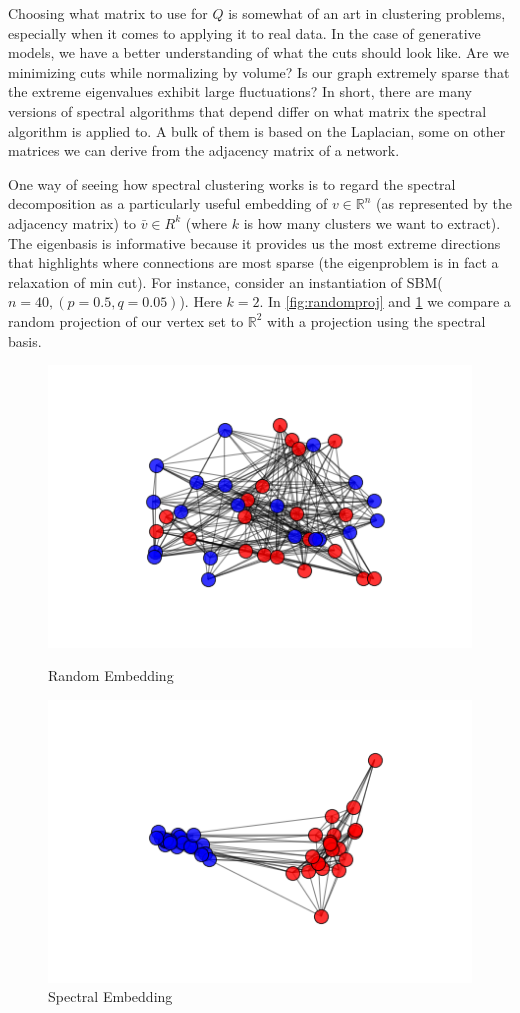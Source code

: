 Choosing what matrix to use for $Q$ is somewhat of an art in clustering problems, especially when it comes to applying it to real data.  In the case of generative models, we have a better understanding of what the cuts should look like.  Are we minimizing cuts while normalizing by volume?  Is our graph extremely sparse that the extreme eigenvalues exhibit large fluctuations?  In short, there are many versions of spectral algorithms that depend differ on what matrix the spectral algorithm is applied to.  A bulk of them is based on the Laplacian, some on other matrices we can derive from the adjacency matrix of a network. 

One way of seeing how spectral clustering works is to regard the spectral decomposition as a particularly useful embedding of $v \in \mathbb{R}^n$ (as represented by the adjacency matrix) to $\bar{v} \in R^k$ (where $k$ is how many clusters we want to extract).  The eigenbasis is informative because it provides us the most extreme directions that highlights where connections are most sparse (the eigenproblem is in fact a relaxation of min cut).  For instance, consider an instantiation of SBM($n =40, (p = 0.5, q = 0.05)$).  Here $k = 2$.  In \ref{fig:randomproj} and \ref{fig:spectralproj} we compare a random projection of our vertex set to $\mathbb{R}^2$ with a projection using the spectral basis.  

\begin{figure}[h]
  \includegraphics[scale=0.6]{SBM_balanced_large_dense_rand.png}
  \caption{Random Embedding}
  \label{fig:randomproj}
\endminipage\hfill
{}
  \includegraphics[scale=0.6]{SBM_balanced_large_dense_spectral.png}
  \caption{Spectral Embedding}
  \label{fig:spectralproj}
\endminipage\hfill
\end{figure}

